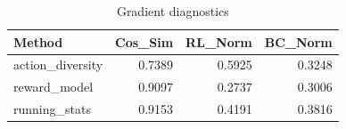 \begin{table}[htbp]
\centering
\caption{Gradient diagnostics}
\label{tab:grad-diag}
\begin{tabular}{lrrr}
\toprule
\textbf{Method} & \textbf{Cos\_Sim} & \textbf{RL\_Norm} & \textbf{BC\_Norm} \\
\midrule
action\_diversity & 0.7389 & 0.5925 & 0.3248 \\
reward\_model & 0.9097 & 0.2737 & 0.3006 \\
running\_stats & 0.9153 & 0.4191 & 0.3816 \\
\bottomrule
\end{tabular}
\end{table}